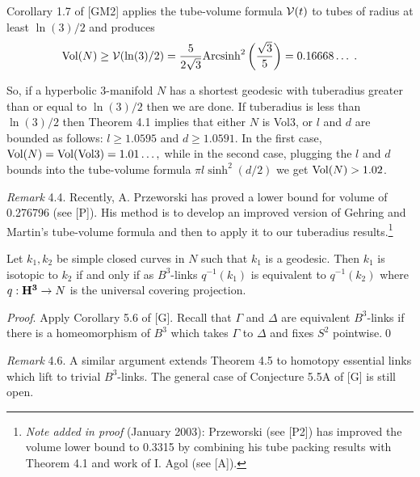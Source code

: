  Corollary 1.7 of [GM2] applies the tube-volume formula ${\cal V}(t)$ to tubes of radius at least
$\ln(3)/2$ and produces 
$${\rm Vol}(N) \ge {\cal V}(\ln(3)/2) = {5 \over 2 \sqrt 3} {\rm Arcsinh}^2\left({ \sqrt 3 \over 5}\right) =
0.16668\ldots\; .$$

So, if a hyperbolic $3$-manifold $N$ has a shortest geodesic with tuberadius
greater than or equal to $\ln(3)/2$ then we are done.  
If tuberadius is less than $\ln(3)/2$ then Theorem 4.1 implies that
either $N$ is Vol3, 
or $l$ and $d$ are bounded as follows: $l \ge 
1.0595$  and $d \ge 1.0591.$
 In the first case, 
  ${\rm Vol}(N)  = {\rm Vol}({\rm Vol3}) = 1.01\ldots,$
while in the second case, plugging the $l$ and $d$ bounds into the tube-volume formula $\pi l \sinh^2(d/2)$
 we get ${\rm Vol}(N) > 1.02$.
\enddemo

{\it Remark} 4.4. Recently, A. Przeworski has proved a lower bound for volume of 0.276796 (see [P]).  His method is
to develop an improved version of Gehring and Martin's tube-volume formula and then to apply it to our tuberadius
results.\footnote{{\it Note added in proof} (January 2003): Przeworski (see [P2]) has improved the volume
lower bound to 0.3315 by combining his tube packing results with Theorem 4.1 and work of I. Agol (see [A]).} 

  Let $k_1, k_2$  be simple closed curves in $N$ such that $k_1$ is
a geodesic.  Then $k_1$ is isotopic to $k_2$ if and only if as $B^3$\/{\rm -}\/links
$q^{-1}(k_1)$ is equivalent to $q^{-1}(k_2)$ where $q : {\bf H^3} \to N$ is the universal covering
projection.
\endproclaim

{\it Proof}.  Apply Corollary 5.6 of [G]. 
Recall that $\Gamma$ and $\Delta$ are equivalent 
$B^3$-links  if there is a homeomorphism of $B^3$ which takes $\Gamma$ to
$\Delta$ and fixes $S^2$ pointwise.\hfill\qed{}

{\it Remark} 4.6.  A similar argument extends Theorem 4.5 to homotopy essential
links which lift to trivial $B^3$-links.  The general case of Conjecture 5.5A of [G] is still open.

 

 

